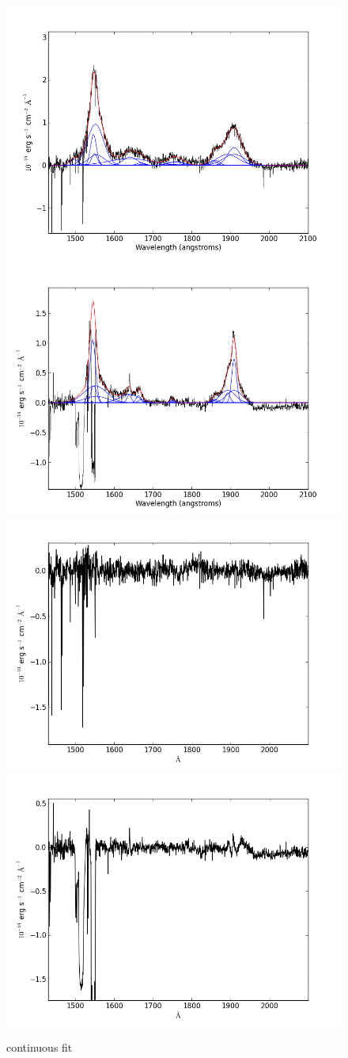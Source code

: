 \documentclass[usenatbib]{mn2e}
\begin{document}
\newpage


\begin{figure}
\begin{center}
\includegraphics[width=0.46\linewidth,angle=0]{C_6.png}
\vspace{5mm}
\includegraphics[width=0.49\linewidth,angle=0]{C_7.png}\\
\includegraphics[width=0.46\linewidth,angle=0]{C_res_6.png}
\hspace{5mm}
\includegraphics[width=0.49\linewidth,angle=0]{C_res_7.png}\\
\end{center} 
\caption{continuous fit \label{fig:landscape}}   
\end{figure}
\end{document}
